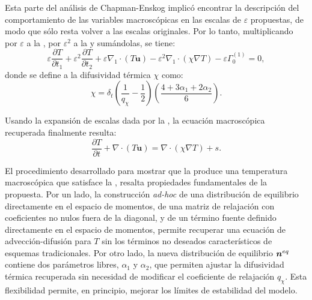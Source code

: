 Esta parte del an\'alisis de Chapman-Enskog implic\'o encontrar la descripci\'on del comportamiento de las variables macrosc\'opicas en las escalas de $\varepsilon$ propuestas, de modo que s\'olo resta volver a las escalas originales. Por lo tanto, multiplicando por $\varepsilon$ a la , por $\varepsilon^2$ a la  y sum\'andolas, se tiene:
\begin{equation}
	\varepsilon \dfrac{\partial T}{\partial t_1} + \varepsilon^2 \dfrac{\partial T}{\partial t_2} + \varepsilon \nabla_1 \cdot (T\bm{u}) - \varepsilon^2 \nabla_1 \cdot (\chi \nabla T) - \varepsilon \Gamma_0^{(1)} = 0,
\end{equation}
donde se define a la difusividad t\'ermica $\chi$ como:
\begin{equation}
	\chi = \delta_t \left( \dfrac{1}{q_{\chi}} - \dfrac{1}{2} \right) \left( \dfrac{4+3\alpha_1 + 2\alpha_2}{6} \right).
	\label{eq:modelo_2d_chi}
\end{equation}

Usando la expansi\'on de escalas dada por la , la ecuaci\'on macrosc\'opica recuperada finalmente resulta:
\begin{equation}
	\dfrac{\partial T}{\partial t} + \nabla \cdot (T\bm{u}) = \nabla \cdot (\chi \nabla T) + s.
	\label{eq:T_2d}
\end{equation}

El procedimiento desarrollado para mostrar que la  produce una temperatura macrosc\'opica que satisface la , resalta propiedades fundamentales de la propuesta. Por un lado, la construcci\'on \emph{ad-hoc} de una distribuci\'on de equilibrio directamente en el espacio de momentos, de una matriz de relajaci\'on con coeficientes no nulos fuera de la diagonal, y de un t\'ermino fuente definido directamente en el espacio de momentos, permite recuperar una ecuaci\'on de advecci\'on-difusi\'on para $T$ sin los t\'erminos no deseados caracter\'isticos de esquemas tradicionales. Por otro lado, la nueva distribuci\'on de equilibrio $\bm{n}^{eq}$ contiene dos par\'ametros libres, $\alpha_1$ y $\alpha_2$, que permiten ajustar la difusividad t\'ermica recuperada sin necesidad de modificar el coeficiente de relajaci\'on $q_{\chi}$. Esta flexibilidad permite, en principio, mejorar los l\'imites de estabilidad del modelo.

